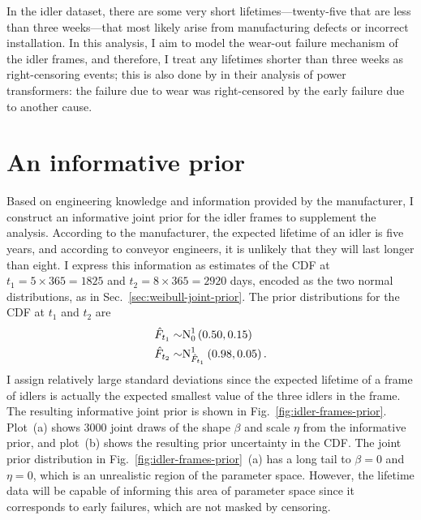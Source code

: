 In the idler dataset, there are some very short lifetimes---twenty-five that are less than three weeks---that most likely arise from manufacturing defects or incorrect installation. In this analysis, I aim to model the wear-out failure mechanism of the idler frames, and therefore, I treat any lifetimes shorter than three weeks as right-censoring events; this is also done by \citet{hong2009} in their analysis of power transformers: the failure due to wear was right-censored by the early failure due to another cause.

\section{An informative prior} \label{sec:idler-frame-joint-prior}

Based on engineering knowledge and information provided by the manufacturer, I construct an informative joint prior for the idler frames to supplement the analysis. According to the manufacturer, the expected lifetime of an idler is five years, and according to conveyor engineers, it is unlikely that they will last longer than eight. I express this information as estimates of the CDF at $t_1 = 5 \times 365 = 1825$ and $t_2 = 8 \times 365 = 2920$ days, encoded as the two normal distributions, as in Sec.~\ref{sec:weibull-joint-prior}. The prior distributions for the CDF at $t_1$ and $t_2$ are
\begin{align*}
  \hat{F}_{t_1} \sim & \hbox{N}^{1}_{0}\left(0.50, 0.15\right)    \\
  \hat{F}_{t_2} \sim & \hbox{N}^{1}_{\hat{F}_{t_1}}\left(0.98, 0.05\right).
\end{align*}
I assign relatively large standard deviations since the expected lifetime of a frame of idlers is actually the expected smallest value of the three idlers in the frame. The resulting informative joint prior is shown in Fig.~\ref{fig:idler-frames-prior}. Plot~(a) shows 3000 joint draws of the shape $\beta$ and scale $\eta$ from the informative prior, and plot~(b) shows the resulting prior uncertainty in the CDF. The joint prior distribution in Fig.~\ref{fig:idler-frames-prior}~(a) has a long tail to $\beta = 0$ and $\eta = 0$, which is an unrealistic region of the parameter space. However, the lifetime data will be capable of informing this area of parameter space since it corresponds to early failures, which are not masked by censoring.

